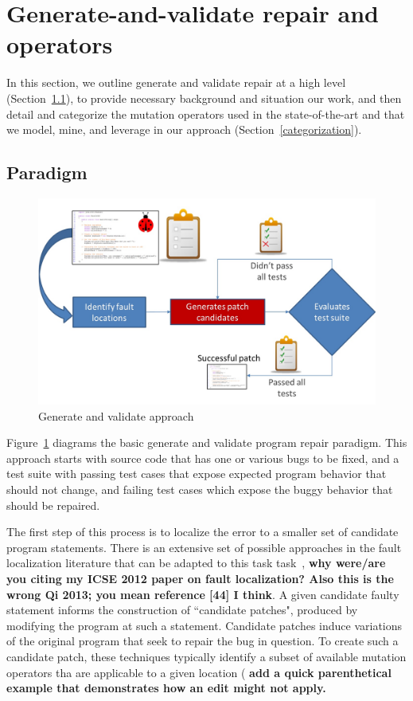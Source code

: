 \documentclass[conference]{IEEEtran}
\newcommand{\todo}[1]
  {{\scriptsize \textbf{\color{red} {#1}}}}
\begin{document}
\section{Generate-and-validate repair and operators} 
\label{background}

In this section, we outline generate and validate repair at a high level
(Section~\ref{sec-paradigm}), to provide necessary background and situation our
work, and then detail and categorize the mutation operators used in the
state-of-the-art and that we model, mine, and leverage in our approach
(Section~\ref{categorization}).  


\subsection{Paradigm}
\label{sec-paradigm}


\begin{figure}[!h]
  \centering
    \includegraphics[scale=0.25]{Picture1}
  \caption{Generate and validate approach}
  \label{fig:generateandvalidate}
\end{figure}

Figure~\ref{fig:generateandvalidate} diagrams the basic generate and validate
program repair paradigm. This approach starts with source code that
has one or various bugs to be fixed, and a test suite with passing
test cases that expose expected program behavior that should not change, and failing test 
cases which expose the buggy behavior that should be repaired.  

The first step of this process is to localize the error to a smaller set of
candidate program statements. There is an extensive set of possible approaches
in the fault localization literature that can be adapted to this task
task~\cite{Jones05,Jones02,Chen02,Qi13},\todo{why were/are you
  citing my ICSE 2012 paper on fault localization?  Also this is the wrong Qi 2013;
you mean reference [44] I think}.  A given candidate faulty statement informs
the construction of 
``candidate patches", produced by modifying the program at such a
statement. Candidate patches induce variations of the original program 
that seek to repair the bug in question. To 
create such a candidate patch, these techniques typically identify a subset of
available mutation operators tha are applicable to a given location (\todo{add
  a quick parenthetical example that demonstrates how an edit might not apply.}
\end{document}
